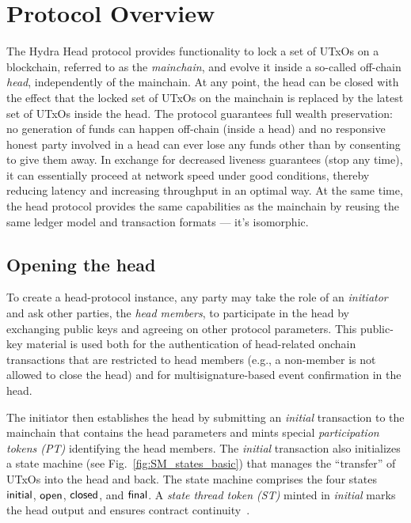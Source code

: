 \section{Protocol Overview}\label{sec:overview}


The Hydra Head protocol provides functionality to lock a set of UTxOs on a
blockchain, referred to as the \emph{mainchain}, and evolve it inside a
so-called off-chain \emph{head}, independently of the mainchain. At any point,
the head can be closed with the effect that the locked set of UTxOs on the
mainchain is replaced by the latest set of UTxOs inside the head. The protocol
guarantees full wealth preservation: no generation of funds can happen off-chain
(inside a head) and no responsive honest party involved in a head can ever lose
any funds other than by consenting to give them away. In exchange for decreased
liveness guarantees (stop any time), it can essentially proceed at network speed
under good conditions, thereby reducing latency and increasing throughput in an
optimal way. At the same time, the head protocol provides the same capabilities
as the mainchain by reusing the same ledger model and transaction formats --- it's
isomorphic.

\subsection{Opening the head}

To create a head-protocol instance, any party may take the role of an
\emph{initiator} and ask other parties, the \emph{head members}, to participate
in the head by exchanging public keys and agreeing on other protocol parameters.
This public-key material is used both for the authentication of head-related
onchain transactions that are restricted to head members (e.g., a non-member is
not allowed to close the head) and for multisignature-based event confirmation
in the head.

The initiator then establishes the head by submitting an \emph{initial}
transaction to the mainchain that contains the head parameters and mints special
\emph{participation tokens (PT)} identifying the head members. The
\emph{initial} transaction also initializes a state machine (see
Fig.~\ref{fig:SM_states_basic}) that manages the ``transfer'' of UTxOs into the
head and back. The state machine comprises the four states $\mathsf{initial}$,
$\mathsf{open}$, $\mathsf{closed}$, and $\mathsf{final}$. A \emph{state thread token (ST)} minted
in \emph{initial} marks the head output and ensures contract
continuity~\cite{eutxo}.

